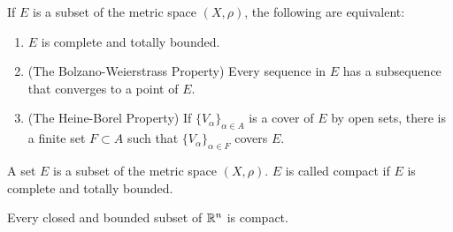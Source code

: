 \begin{theorem}
    If $E$ is a subset of the metric space $(X, \rho)$, the following are equivalent:
    \begin{enumerate}
        \item $E$ is complete and totally bounded.
        \item (The Bolzano-Weierstrass Property) Every sequence in $E$ has a subsequence that converges to a point of $E$.
        \item (The Heine-Borel Property) If $\{ V_{\alpha} \}_{\alpha \in A}$ is a cover of $E$ by open sets, there is a finite set $F \subset A$ such that $\{ V_{\alpha} \}_{\alpha \in F}$ covers $E$.
    \end{enumerate}
\end{theorem}

\begin{definition}[Compact]
    A set $E$ is a subset of the metric space $(X, \rho)$.
    $E$ is called compact if $E$ is complete and totally bounded.
\end{definition}

\begin{theorem}
    Every closed and bounded subset of $\mathbb{R}^n$ is compact.
\end{theorem}